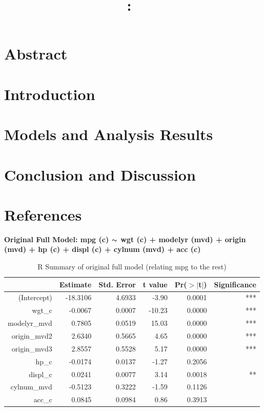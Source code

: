 \documentclass{article}
\title{
    \vspace{2in}
    \textmd{\textbf{\hmwkClass:\ \hmwkTitle}}\\
    \normalsize\vspace{0.1in}\small\vspace{0.1in}\large{\textit{\hmwkClassInstructor}}
    \vspace{3in}
}
\author{\hmwkAuthorName}
\date{}
\newcommand{\mt}[1]{\ensuremath{#1}}
\newcommand{\tl}{\mt{\thicksim} }
\begin{document}
\maketitle

\newpage

\tableofcontents

\listoftables

\listoffigures

\section{Abstract}
\section{Introduction}
\section{Models and Analysis Results}
\section{Conclusion and Discussion}
\section{References}

\newpage

\textbf{Original Full Model: mpg (c) \tl wgt (c) + modelyr (mvd) + origin (mvd) + hp (c) + displ (c) + cylnum (mvd) + acc (c)}

\begin{table}[ht]
\centering
\begin{tabular}{rrrrrr}
  \hline
 & Estimate & Std. Error & t value & Pr($>$$|$t$|$) & Significance \\ 
  \hline
(Intercept) & -18.3106 & 4.6933 & -3.90 & 0.0001 & *** \\ 
  wgt\_c & -0.0067 & 0.0007 & -10.23 & 0.0000 & ***  \\ 
  modelyr\_mvd & 0.7805 & 0.0519 & 15.03 & 0.0000 & ***  \\ 
  origin\_mvd2 & 2.6340 & 0.5665 & 4.65 & 0.0000 & ***  \\ 
  origin\_mvd3 & 2.8557 & 0.5528 & 5.17 & 0.0000 & ***  \\ 
  hp\_c & -0.0174 & 0.0137 & -1.27 & 0.2056 & \\ 
  displ\_c & 0.0241 & 0.0077 & 3.14 & 0.0018 & ** \\ 
  cylnum\_mvd & -0.5123 & 0.3222 & -1.59 & 0.1126 & \\ 
  acc\_c & 0.0845 & 0.0984 & 0.86 & 0.3913 & \\ 
   \hline
\end{tabular}
\caption{R Summary of original full model (relating mpg to the rest)}
\label{tab:myfirsttable}
\end{table}
\end{document}
